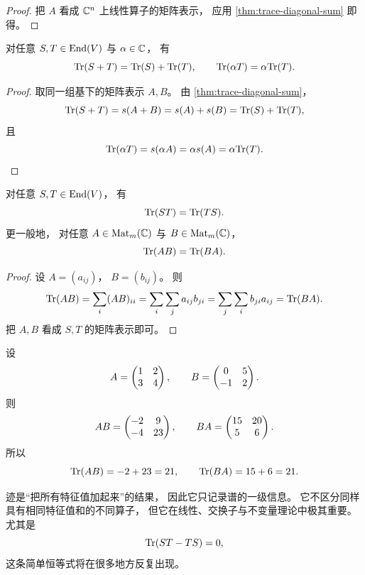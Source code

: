\begin{proof} 把 \(A\) 看成 \(\mathbb{C}^n\) 上线性算子的矩阵表示， 应用 \cref{thm:trace-diagonal-sum} 即得。 \end{proof}




\begin{proposition}\label{prop:trace-linearity} 对任意 \(S,T\in \mathrm{End}(V)\) 与 \(\alpha\in \mathbb{C}\)， 有 \[ \mathrm{Tr}(S+T)=\mathrm{Tr}(S)+\mathrm{Tr}(T),\qquad \mathrm{Tr}(\alpha T)=\alpha \mathrm{Tr}(T). \] \end{proposition}




\begin{proof} 取同一组基下的矩阵表示 \(A,B\)。 由 \cref{thm:trace-diagonal-sum}， \[ \mathrm{Tr}(S+T)=s(A+B)=s(A)+s(B)=\mathrm{Tr}(S)+\mathrm{Tr}(T), \] 且 \[ \mathrm{Tr}(\alpha T)=s(\alpha A)=\alpha s(A)=\alpha\mathrm{Tr}(T). \] \end{proof}




\begin{proposition}\label{prop:trace-cyclic} 对任意 \(S,T\in \mathrm{End}(V)\)， 有 \[ \mathrm{Tr}(ST)=\mathrm{Tr}(TS). \] 更一般地， 对任意 \(A\in \mathrm{Mat}_m(\mathbb{C})\) 与 \(B\in \mathrm{Mat}_{m}(\mathbb{C})\)， \[ \mathrm{Tr}(AB)=\mathrm{Tr}(BA). \] \end{proposition}




\begin{proof} 设 \(A=(a_{ij})\)， \(B=(b_{ij})\)。 则 \[ \mathrm{Tr}(AB)=\sum_i (AB)_{ii} =\sum_i\sum_j a_{ij}b_{ji} =\sum_j\sum_i b_{ji}a_{ij} =\mathrm{Tr}(BA). \] 把 \(A,B\) 看成 \(S,T\) 的矩阵表示即可。 \end{proof}




\begin{example} 设 \[ A=\begin{pmatrix} 1&2\\3&4 \end{pmatrix},\qquad B=\begin{pmatrix} 0&5\\-1&2 \end{pmatrix}. \] 则 \[ AB=\begin{pmatrix} -2&9\\-4&23 \end{pmatrix},\qquad BA=\begin{pmatrix} 15&20\\5&6 \end{pmatrix}. \] 所以 \[ \mathrm{Tr}(AB)=-2+23=21,\qquad \mathrm{Tr}(BA)=15+6=21. \] \end{example}




\begin{remark} 迹是“把所有特征值加起来”的结果， 因此它只记录谱的一级信息。 它不区分同样具有相同特征值和的不同算子， 但它在线性、交换子与不变量理论中极其重要。 尤其是 \[ \mathrm{Tr}(ST-TS)=0, \] 这条简单恒等式将在很多地方反复出现。 \end{remark}




